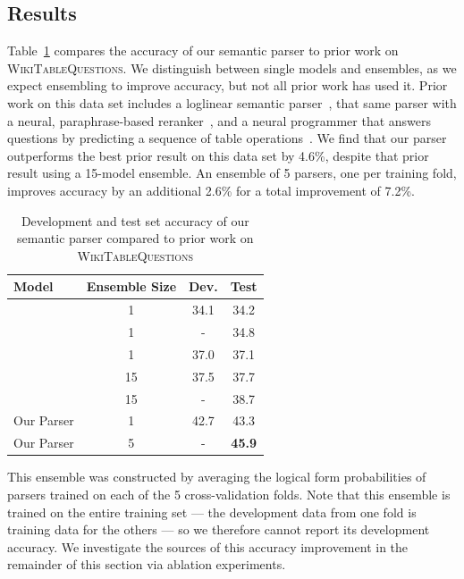 \subsection{Results}
Table~\ref{tab:nnsp_wikitables_results} compares the accuracy of our semantic parser 
to prior work on \textsc{WikiTableQuestions}.
We distinguish between single models and ensembles, as we expect ensembling to 
improve accuracy, but not all prior work has used it.
Prior work on this data set includes a loglinear semantic
parser~\citep{pasupat2015compositional}, that same parser with a neural,
paraphrase-based
reranker~\citep{haug2017neural}, and a neural programmer that answers questions by predicting a 
sequence of table operations~\citep{Neelakantan2016LearningAN}.  
We find that our parser outperforms the best prior result on this data set by 
4.6\%, despite that prior result using a 15-model ensemble.
An ensemble of 5 parsers, one per training fold, improves accuracy by an 
additional 2.6\% for a total improvement of 7.2\%.
\begin{table}
    \centering
    \begin{tabular}{lccc}
	\toprule
        \textbf{Model} & \textbf{Ensemble Size} & \textbf{Dev.} & \textbf{Test} \\
        \midrule 
        \cite{Neelakantan2016LearningAN} & 1 & 34.1 & 34.2 \\
        \cite{haug2017neural} & 1 & - & 34.8 \\
        \cite{pasupat2015compositional} & 1 & 37.0 & 37.1 \\
        \cite{Neelakantan2016LearningAN} & 15 & 37.5 & 37.7 \\
        \cite{haug2017neural} & 15 & - & 38.7 \\
        \midrule
        Our Parser & 1 & 42.7 & 43.3 \\
        Our Parser & 5 & - & \textbf{45.9} \\
        \bottomrule
    \end{tabular}
    \caption{Development and test set accuracy of our semantic parser compared
	to prior work on \textsc{WikiTableQuestions}}\label{tab:nnsp_wikitables_results}
\end{table}

This ensemble was constructed by averaging the logical form probabilities of
parsers trained on each of the 5 cross-validation folds.  Note that this
ensemble is trained on the entire training set --- the development data from one
fold is training data for the others --- so we therefore cannot report its
development accuracy.  We investigate the sources of this accuracy improvement
in the remainder of this section via ablation experiments.

